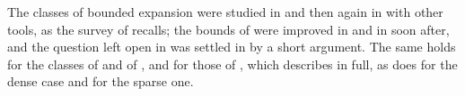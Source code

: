 The classes of bounded expansion were studied in  and
then again in  with other tools, as the survey of
 recalls; the bounds of  were
improved in  and in  soon after,
and the question left open in  was settled in
 by a short argument. The same holds for the classes of
 and of , and for those of
, which  describes in full, as does
 for the dense case and  for the
sparse one.
